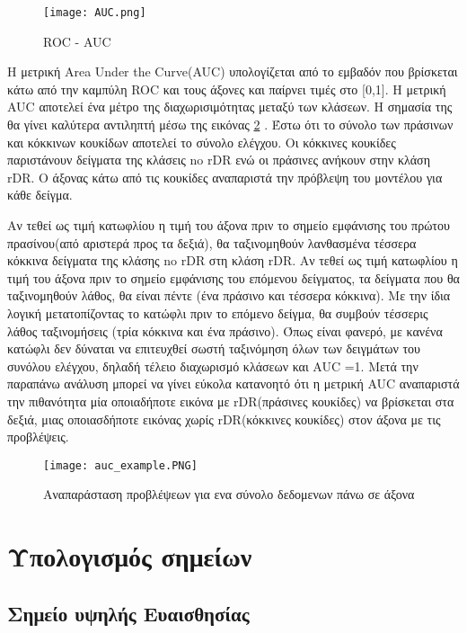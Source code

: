 \begin{figure}[!h]
    \centering
      \texttt{[image: AUC.png]} \caption{ROC - AUC}
       \label{figure: AUC}    
  \end{figure}



Η μετρική Area Under the Curve(AUC) υπολογίζεται από το εμβαδόν που βρίσκεται κάτω από την καμπύλη ROC και τους άξονες και παίρνει τιμές στο [0,1]. Η μετρική AUC αποτελεί ένα μέτρο της διαχωρισιμότητας μεταξύ των κλάσεων. Η σημασία της θα γίνει καλύτερα αντιληπτή μέσω της εικόνας \ref{figure:aucExample} \cite{ROC}. Έστω ότι το σύνολο των πράσινων και κόκκινων κουκίδων αποτελεί το σύνολο ελέγχου. Οι κόκκινες κουκίδες παριστάνουν δείγματα της κλάσεις no rDR ενώ οι πράσινες ανήκουν στην κλάση rDR.
Ο άξονας κάτω από τις κουκίδες αναπαριστά την πρόβλεψη του μοντέλου για κάθε δείγμα.  

Αν τεθεί ως τιμή  κατωφλίου η τιμή του άξονα πριν το σημείο εμφάνισης του πρώτου πρασίνου(από αριστερά προς τα δεξιά), θα ταξινομηθούν λανθασμένα τέσσερα κόκκινα δείγματα της κλάσης no rDR στη κλάση rDR. Αν τεθεί ως τιμή κατωφλίου η τιμή του άξονα πριν το σημείο εμφάνισης του επόμενου δείγματος, τα δείγματα που θα ταξινομηθούν λάθος, θα είναι πέντε (ένα πράσινο και τέσσερα κόκκινα). Με την ίδια λογική μετατοπίζοντας το κατώφλι πριν το επόμενο δείγμα, θα συμβούν τέσσερις λάθος ταξινομήσεις (τρία κόκκινα και ένα πράσινο). Όπως είναι φανερό, με κανένα κατώφλι δεν δύναται να επιτευχθεί σωστή ταξινόμηση όλων των δειγμάτων του συνόλου ελέγχου, δηλαδή τέλειο διαχωρισμό κλάσεων και AUC =1. Μετά την παραπάνω ανάλυση μπορεί να γίνει εύκολα κατανοητό ότι η μετρική AUC αναπαριστά την πιθανότητα μία οποιαδήποτε εικόνα με rDR(πράσινες κουκίδες) να βρίσκεται στα δεξιά, μιας οποιασδήποτε εικόνας χωρίς rDR(κόκκινες κουκίδες) στον άξονα με τις προβλέψεις. 

\begin{figure}[!h]
    \centering
      \texttt{[image: auc\_example.PNG]} \caption{Αναπαράσταση προβλέψεων για ενα σύνολο δεδομενων πάνω σε άξονα}
       \label{figure:aucExample}    
  \end{figure}
  
  
  
\section{Υπολογισμός σημείων}
\label{sec:6.3}


\subsection{Σημείο υψηλής Ευαισθησίας}
\label{subsec:6.3.1}




